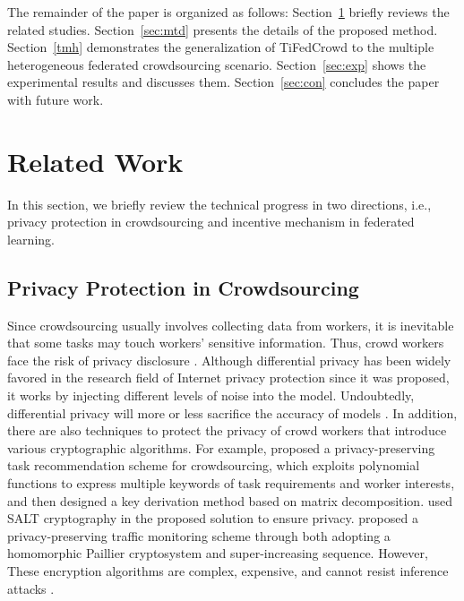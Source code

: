 \documentclass[final,1p,times]{elsarticle}
\begin{document}
The remainder of the paper is organized as follows: Section~\ref{sec:rw} briefly reviews the related studies.  Section~\ref{sec:mtd} presents the details of the proposed method. Section~\ref{tmh} demonstrates the generalization of TiFedCrowd to the multiple heterogeneous federated crowdsourcing scenario. Section~\ref{sec:exp} shows the experimental results and discusses them. Section~\ref{sec:con} concludes the paper with future work.

\section{Related Work}\label{sec:rw}
In this section, we briefly review the technical progress in two directions, i.e., privacy protection in crowdsourcing and incentive mechanism in federated learning.

\subsection{Privacy Protection in Crowdsourcing}
Since crowdsourcing usually involves collecting data from workers, it is inevitable that some tasks may touch workers' sensitive information. Thus, crowd workers face the risk of privacy disclosure \citep{xu2019blockchain,zhang2020decentralized}. Although differential privacy \citep{dwork2006differential} has been widely favored in the research field of Internet privacy protection since it was proposed, it works by injecting different levels of noise into the model. Undoubtedly, differential privacy will more or less sacrifice the accuracy of models \citep{bagdasaryan2019differential}. In addition, there are also techniques to protect the privacy of crowd workers that introduce various cryptographic algorithms. For example, \cite{shu2018privacy} proposed a privacy-preserving task recommendation scheme for crowdsourcing, which exploits polynomial functions to express multiple keywords of task requirements and worker interests, and then designed a key derivation method based on matrix decomposition. \cite{joshi2020salt} used SALT cryptography in the proposed solution to ensure privacy. \cite{zhang2019privacy} proposed a privacy-preserving traffic monitoring scheme through both adopting a homomorphic Paillier cryptosystem and super-increasing sequence. However, These encryption algorithms are complex, expensive, and cannot resist inference attacks \citep{lin2020secbcs,wang2019towards}.
\end{document}
